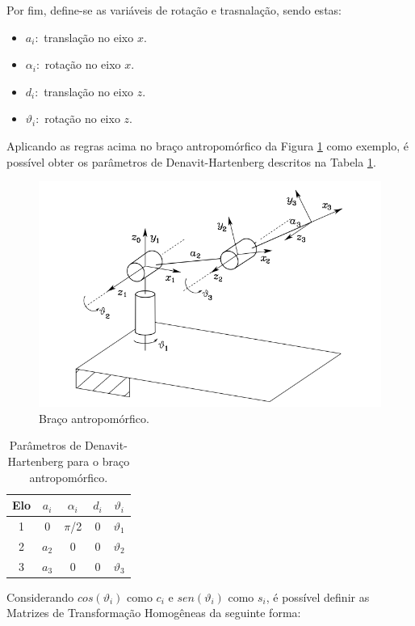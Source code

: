 Por fim, define-se as variáveis de rotação e trasnalação, sendo estas:

\begin{itemize}
\item $a_i:$ translação no eixo $x$.
\item $\alpha_i:$ rotação no eixo $x$. 
\item $d_i:$ translação no eixo $z$.
\item $\vartheta_i:$ rotação no eixo $z$. 
\end{itemize}

Aplicando as regras acima no braço antropomórfico da Figura \ref{fig:BracoAntro} como exemplo, é possível obter os parâmetros de Denavit-Hartenberg descritos na Tabela \ref{table:3_01}.

\begin{figure}[b!]
\centering
\includegraphics[width=0.7\columnwidth]{Imagens/BracoAntropo.PNG}
\caption{Braço antropomórfico.\cite{siciliano2010robotics}}
\label{fig:BracoAntro}
\end{figure}

\begin{table}[h!]
\centering
\begin{tabular}{c|c|c|c|c}
 \hline
 Elo & $a_i$ & $\alpha_i$ & $d_i$ & $\vartheta_i$ \\ [0.5ex] 
 \hline\hline
 1 & 0 & $\pi$/2 & 0 & $\vartheta_1$ \\ 
 2 & $a_2$ & 0 & 0 & $\vartheta_2$ \\ 
 3 & $a_3$ & 0 & 0 & $\vartheta_3$ \\ 
 \hline
\end{tabular}
\caption{Parâmetros de Denavit-Hartenberg para o braço antropomórfico.}
\label{table:3_01}
\end{table}

Considerando $cos(\vartheta_i)$ como $c_i$ e $sen(\vartheta_i)$ como $s_i$, é possível definir as Matrizes de Transformação Homogêneas da seguinte forma:

